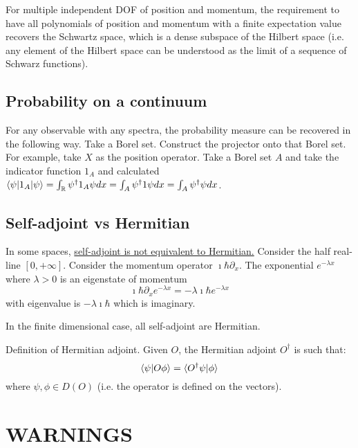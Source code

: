 For multiple independent DOF of position and momentum, the requirement to have all polynomials of position and momentum with a finite expectation value recovers the Schwartz space, which is a dense subspace of the Hilbert space (i.e. any element of the Hilbert space can be understood as the limit of a sequence of Schwarz functions).


\subsection{Probability on a continuum}


For any observable with any spectra, the probability measure can be recovered in the following way. Take a Borel set. Construct the projector onto that Borel set. For example, take $X$ as the position operator. Take a Borel set $A$ and take the indicator function $1_A$ and calculated $\langle \psi | 1_A | \psi \rangle = \int_{\mathbb{R}} \psi^\dagger 1_A \psi dx = \int_{A} \psi^\dagger 1 \psi dx = \int_{A} \psi^\dagger \psi dx$.

\subsection{Self-adjoint vs Hermitian}

In some spaces,  \href{https://math.stackexchange.com/questions/38387/distinguishing-between-symmetric-hermitian-and-self-adjoint-operators}{self-adjoint is not equivalent to Hermitian.} Consider the half real-line $[0, +\infty]$. Consider the momentum operator $\imath \hbar \partial_x $. The exponential $e^{-\lambda x}$ where $\lambda > 0$ is an eigenstate of momentum
\begin{equation}
	\imath \hbar \partial_x e^{-\lambda x} = - \lambda \imath \hbar e^{-\lambda x}
\end{equation}
with eigenvalue is $- \lambda \imath \hbar$ which is imaginary.

In the finite dimensional case, all self-adjoint are Hermitian.

Definition of Hermitian adjoint. Given $O$, the Hermitian adjoint $O^\dagger$ is such that:
\begin{equation}
	\langle\psi|O \phi\rangle = \langle O^\dagger \psi | \phi \rangle
\end{equation}
where $\psi, \phi \in D(O)$ (i.e. the operator is defined on the vectors).


\section{WARNINGS}

